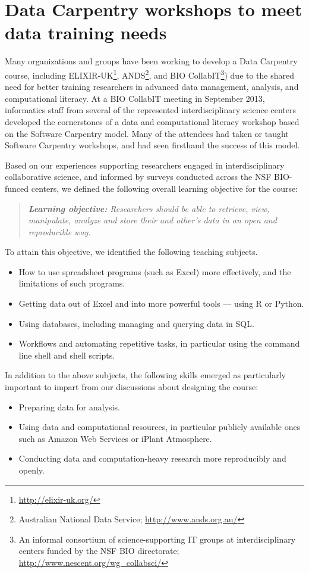 \documentclass[11pt]{article}
\begin{document}
\section{Data Carpentry workshops to meet data training needs} \label{sec:dc-workshops}

Many organizations and groups have been working to develop a Data
Carpentry course, including
ELIXIR-UK\footnote{\url{http://elixir-uk.org/}},
ANDS\footnote{Australian National Data Service;
  \url{http://www.ands.org.au/}}, and BIO CollabIT\footnote{An
  informal consortium of science-supporting IT groups at
  interdisciplinary centers funded by the NSF BIO directorate;
  \url{http://www.nescent.org/wg_collabsci/}}) due to the shared need
for better training researchers in advanced data management, analysis,
and computational literacy. At a BIO CollabIT meeting in September
2013, informatics staff from several of the represented
interdisciplinary science centers developed the cornerstones of a data
and computational literacy workshop based on the Software Carpentry
model. Many of the attendees had taken or taught Software Carpentry
workshops, and had seen firsthand the success of this model.

Based on our experiences supporting researchers engaged in
interdisciplinary collaborative science, and informed by surveys
conducted across the NSF BIO-funced centers, we defined the following
overall learning objective for the course:
\begin{quote}{\emph{\textbf{Learning objective:} Researchers should be
      able to retrieve, view, manipulate, analyze and store their and
      other's data in an open and reproducible way.}}
\end{quote}

To attain this objective, we identified the following teaching subjects.
\begin{itemize}
\item How to use spreadsheet programs (such as Excel) more effectively, and the limitations of such programs.
\item Getting data out of Excel and into more powerful tools --- using R or Python.
\item Using databases, including managing and querying data in SQL.
\item Workflows and automating repetitive tasks, in particular using the command line shell and shell scripts.
\end{itemize}

In addition to the above subjects, the following skills emerged as
particularly important to impart from our discussions about designing
the course:
\begin{itemize}
\item Preparing data for analysis.
\item Using data and computational resources, in particular publicly available ones such as Amazon Web Services or iPlant Atmosphere.
\item Conducting data and computation-heavy research more reproducibly and openly.
\end{itemize}
\end{document}
